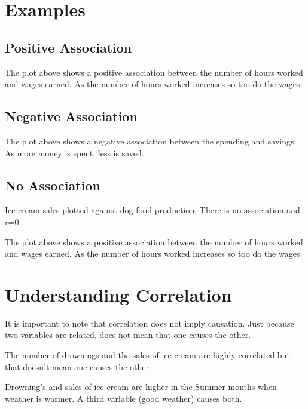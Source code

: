 \documentclass[
]{book}
\begin{document}
\hypertarget{examples}{%
\section{Examples}\label{examples}}

\hypertarget{positive-association}{%
\subsection{Positive Association}\label{positive-association}}

The plot above shows a positive association between the number of hours worked and wages earned. As the number of hours worked increases so too do the wages.

\hypertarget{negative-association}{%
\subsection{Negative Association}\label{negative-association}}

The plot above shows a negative association between the spending and savings. As more money is spent, less is saved.

\hypertarget{no-association}{%
\subsection{No Association}\label{no-association}}

Ice cream sales plotted against dog food production. There is no association and r=0.

The plot above shows a positive association between the number of hours worked and wages earned. As the number of hours worked increases so too do the wages.

\hypertarget{understanding-correlation}{%
\section{Understanding Correlation}\label{understanding-correlation}}

It is important to note that correlation does not imply causation. Just because two variables are related, does not mean that one causes the other.

The number of drownings and the sales of ice cream are highly correlated but that doesn't mean one causes the other.

Drowning's and sales of ice cream are higher in the Summer months when weather is warmer. A third variable (good weather) causes both.
\end{document}
